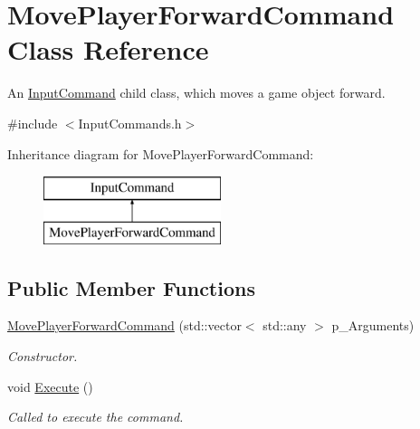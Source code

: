 \hypertarget{class_move_player_forward_command}{}\section{Move\+Player\+Forward\+Command Class Reference}
\label{class_move_player_forward_command}


An \mbox{\hyperlink{class_input_command}{Input\+Command}} child class, which moves a game object forward.  




{\ttfamily \#include $<$Input\+Commands.\+h$>$}

Inheritance diagram for Move\+Player\+Forward\+Command\+:\begin{figure}[H]
\begin{center}
\leavevmode
\includegraphics[height=2.000000cm]{class_move_player_forward_command}
\end{center}
\end{figure}
\subsection*{Public Member Functions}
\begin{DoxyCompactItemize}
\item 
\mbox{\hyperlink{class_move_player_forward_command_a80bf9bb58d10e2fe389244a0e94e4935}{Move\+Player\+Forward\+Command}} (std\+::vector$<$ std\+::any $>$ p\+\_\+\+Arguments)
\begin{DoxyCompactList}\small\item\em Constructor. \end{DoxyCompactList}\item 
\mbox{\label{class_move_player_forward_command_a1c0bc247b5b1245897c95d598621dc30}} 
void \mbox{\hyperlink{class_move_player_forward_command_a1c0bc247b5b1245897c95d598621dc30}{Execute}} ()
\begin{DoxyCompactList}\small\item\em Called to execute the command. \end{DoxyCompactList}\end{DoxyCompactItemize}
